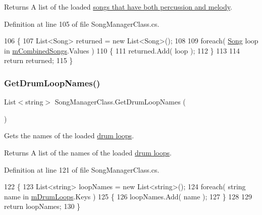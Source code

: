 \begin{DoxyReturn}{Returns}
A list of the loaded \hyperlink{group___song_group_DocSongCombined}{songs that have both percussion and melody}. 
\end{DoxyReturn}


Definition at line 105 of file Song\+Manager\+Class.\+cs.


\begin{DoxyCode}
106     \{
107         List<Song> returned = \textcolor{keyword}{new} List<Song>();
108 
109         \textcolor{keywordflow}{foreach}( \hyperlink{class_song}{Song} loop \textcolor{keywordflow}{in} \hyperlink{group___s_m_priv_var_gaf6b4ff41b8da95d10ad3db62df111faa}{mCombinedSongs}.Values )
110         \{
111             returned.Add( loop );
112         \}
113 
114         \textcolor{keywordflow}{return} returned;
115     \}
\end{DoxyCode}
\mbox{\label{group___s_m_pub_func_ga90e0aeb3117c5db6c667a23252bf45f6}} 
\subsubsection{\texorpdfstring{Get\+Drum\+Loop\+Names()}{GetDrumLoopNames()}}
{\footnotesize\ttfamily List$<$string$>$ Song\+Manager\+Class.\+Get\+Drum\+Loop\+Names (\begin{DoxyParamCaption}{ }\end{DoxyParamCaption})}



Gets the names of the loaded \hyperlink{group___song_group_DocSongDrumLoop}{drum loops}. 

\begin{DoxyReturn}{Returns}
A list of the names of the loaded \hyperlink{group___song_group_DocSongDrumLoop}{drum loops}. 
\end{DoxyReturn}


Definition at line 121 of file Song\+Manager\+Class.\+cs.


\begin{DoxyCode}
122     \{
123         List<string> loopNames = \textcolor{keyword}{new} List<string>();
124         \textcolor{keywordflow}{foreach}( \textcolor{keywordtype}{string} name \textcolor{keywordflow}{in} \hyperlink{group___s_m_priv_var_ga84f25335035755448d11acb9287360f2}{mDrumLoops}.Keys )
125         \{
126             loopNames.Add( name );
127         \}
128 
129         \textcolor{keywordflow}{return} loopNames;
130     \}
\end{DoxyCode}
\mbox{\label{group___s_m_pub_func_ga354a675f296f9a733ad6d76fea7429dd}} 
